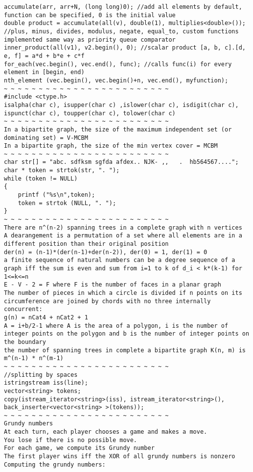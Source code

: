 \documentclass[11pt, oneside]{article}
\begin{document}
\begin{lstlisting}
accumulate(arr, arr+N, (long long)0); //add all elements by default, function can be specified, 0 is the initial value
double product = accumulate(all(v), double(1), multiplies<double>());
//plus, minus, divides, modulus, negate, equal_to, custom functions implemented same way as priority queue comparator
inner_product(all(v1), v2.begin(), 0); //scalar product [a, b, c].[d, e, f] = a*d + b*e + c*f
for_each(vec.begin(), vec.end(), func); //calls func(i) for every element in [begin, end)
nth_element (vec.begin(), vec.begin()+n, vec.end(), myfunction);
~ ~ ~ ~ ~ ~ ~ ~ ~ ~ ~ ~ ~ ~ ~ ~ ~ ~ ~ ~ ~ ~ ~ ~
#include <ctype.h>
isalpha(char c), isupper(char c) ,islower(char c), isdigit(char c), ispunct(char c), toupper(char c), tolower(char c)
~ ~ ~ ~ ~ ~ ~ ~ ~ ~ ~ ~ ~ ~ ~ ~ ~ ~ ~ ~ ~ ~ ~ ~
In a bipartite graph, the size of the maximum independent set (or dominating set) = V-MCBM
In a bipartite graph, the size of the min vertex cover = MCBM
~ ~ ~ ~ ~ ~ ~ ~ ~ ~ ~ ~ ~ ~ ~ ~ ~ ~ ~ ~ ~ ~ ~ ~
char str[] = "abc. sdfksm sgfda afdex.. NJK- ,,   .  hb564567....";
char * token = strtok(str, ". ");
while (token != NULL)
{
    printf ("%s\n",token);
    token = strtok (NULL, ". ");
}
~ ~ ~ ~ ~ ~ ~ ~ ~ ~ ~ ~ ~ ~ ~ ~ ~ ~ ~ ~ ~ ~ ~ ~
There are n^(n-2) spanning trees in a complete graph with n vertices
A dearangement is a permutation of a set where all elements are in a different position than their original position
der(n) = (n-1)*(der(n-1)+der(n-2)), der(0) = 1, der(1) = 0
a finite sequence of natural numbers can be a degree sequence of a graph iff the sum is even and sum from i=1 to k of d_i < k*(k-1) for 1<=k<=n
E - V - 2 = F where F is the number of faces in a planar graph
The number of pieces in which a circle is divided if n points on its circumference are joined by chords with no three internally concurrent:
g(n) = nCat4 + nCat2 + 1
A = i+b/2-1 where A is the area of a polygon, i is the number of integer points on the polygon and b is the number of integer points on the boundary
the number of spanning trees in complete a bipartite graph K(n, m) is m^(n-1) * n^(m-1)
~ ~ ~ ~ ~ ~ ~ ~ ~ ~ ~ ~ ~ ~ ~ ~ ~ ~ ~ ~ ~ ~ ~ ~
//splitting by spaces
istringstream iss(line);
vector<string> tokens;
copy(istream_iterator<string>(iss), istream_iterator<string>(), back_inserter<vector<string> >(tokens));
~ ~ ~ ~ ~ ~ ~ ~ ~ ~ ~ ~ ~ ~ ~ ~ ~ ~ ~ ~ ~ ~ ~ ~
Grundy numbers
At each turn, each player chooses a game and makes a move. 
You lose if there is no possible move.
For each game, we compute its Grundy number
The first player wins iff the XOR of all grundy numbers is nonzero
Computing the grundy numbers:

\end{lstlisting}
\end{document}
